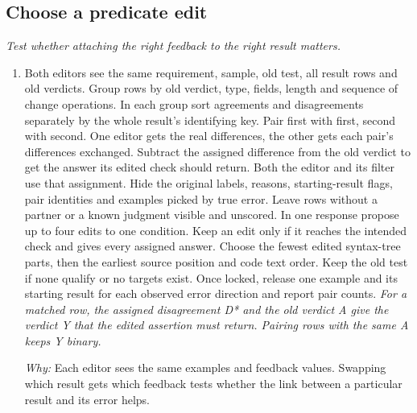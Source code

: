\documentclass[10pt,a4paper]{article}
\begin{document}
\subsection*{Choose a predicate edit}
\emph{Test whether attaching the right feedback to the right result matters.}
\begin{enumerate}[leftmargin=*,start=4]
  \item Both editors see the same requirement, sample, old test, all result rows and old verdicts. Group rows by old verdict, type, fields, length and sequence of change operations. In each group sort agreements and disagreements separately by the whole result’s identifying key. Pair first with first, second with second. One editor gets the real differences, the other gets each pair’s differences exchanged. Subtract the assigned difference from the old verdict to get the answer its edited check should return. Both the editor and its filter use that assignment. Hide the original labels, reasons, starting-result flags, pair identities and examples picked by true error. Leave rows without a partner or a known judgment visible and unscored. In one response propose up to four edits to one condition. Keep an edit only if it reaches the intended check and gives every assigned answer. Choose the fewest edited syntax-tree parts, then the earliest source position and code text order. Keep the old test if none qualify or no targets exist. Once locked, release one example and its starting result for each observed error direction and report pair counts.
\noindent\emph{For a matched row, the assigned disagreement D* and the old verdict A give the verdict Y that the edited assertion must return. Pairing rows with the same A keeps Y binary.}
\par{}
\par\emph{Why:} Each editor sees the same examples and feedback values. Swapping which result gets which feedback tests whether the link between a particular result and its error helps.
\end{enumerate}
\end{document}
